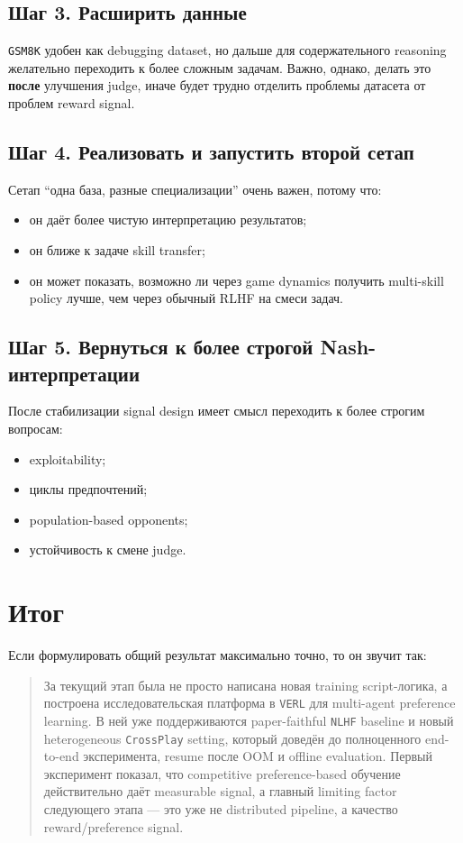 \documentclass[11pt,a4paper]{article}
\begin{document}
\subsection{Шаг 3. Расширить данные}

\texttt{GSM8K} удобен как debugging dataset, но дальше для содержательного reasoning желательно переходить к более сложным задачам. Важно, однако, делать это \textbf{после} улучшения judge, иначе будет трудно отделить проблемы датасета от проблем reward signal.

\subsection{Шаг 4. Реализовать и запустить второй сетап}

Сетап ``одна база, разные специализации'' очень важен, потому что:
\begin{itemize}
  \item он даёт более чистую интерпретацию результатов;
  \item он ближе к задаче skill transfer;
  \item он может показать, возможно ли через game dynamics получить multi-skill policy лучше, чем через обычный RLHF на смеси задач.
\end{itemize}

\subsection{Шаг 5. Вернуться к более строгой Nash-интерпретации}

После стабилизации signal design имеет смысл переходить к более строгим вопросам:
\begin{itemize}
  \item exploitability;
  \item циклы предпочтений;
  \item population-based opponents;
  \item устойчивость к смене judge.
\end{itemize}

\section{Итог}

Если формулировать общий результат максимально точно, то он звучит так:

\begin{quote}
За текущий этап была не просто написана новая training script-логика, а построена исследовательская платформа в \texttt{VERL} для multi-agent preference learning. В ней уже поддерживаются paper-faithful \texttt{NLHF} baseline и новый heterogeneous \texttt{CrossPlay} setting, который доведён до полноценного end-to-end эксперимента, resume после OOM и offline evaluation. Первый эксперимент показал, что competitive preference-based обучение действительно даёт measurable signal, а главный limiting factor следующего этапа --- это уже не distributed pipeline, а качество reward/preference signal.
\end{quote}
\end{document}
